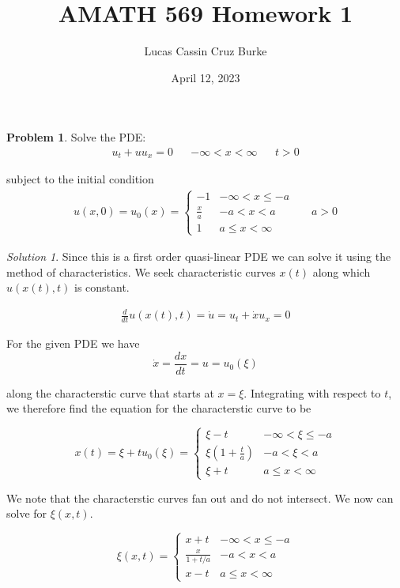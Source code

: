 \documentclass[12pt,a4paper]{article}
\title{AMATH 569 Homework 1}
\author{Lucas Cassin Cruz Burke}
\date{April 12, 2023}
\theoremstyle{definition}
\newtheorem{problem}{Problem}
\theoremstyle{remark}
\newtheorem*{solution}{Solution}
\begin{document}
\maketitle

\begin{problem}
  Solve the PDE: 
  \begin{align*}
    u_t + uu_x = 0 && -\infty < x < \infty && t >0
  \end{align*}

  subject to the initial condition \begin{align*}
    u(x,0) = u_0(x) = \begin{cases}
        -1 & -\infty < x \le -a \\
        \frac{x}{a} & -a < x < a \\
        1 & a \le x < \infty 
    \end{cases} && a>0
  \end{align*}
\end{problem}
\begin{solution}
  Since this is a first order quasi-linear PDE we can solve it using the method of characteristics. We seek characteristic curves $x(t)$ along which $u(x(t),t)$ is constant. 

  \begin{align*}
    \frac{d}{dt} u(x(t), t) = \dot u = u_t + \dot x u_x = 0 
  \end{align*}
\end{solution}

For the given PDE we have $$\dot x = \frac{dx}{dt} = u = u_0(\xi)$$

along the characterstic curve that starts at $x=\xi$. Integrating with respect to $t$, we therefore find the equation for the characterstic curve to be 

$$x(t) = \xi + t u_0(\xi) = \begin{cases}
  \xi -t & -\infty < \xi \le -a \\
  \xi\left( 1 + \frac{t}{a}\right) & -a < \xi < a \\
  \xi +t & a \le x < \infty
\end{cases}$$

We note that the characterstic curves fan out and do not intersect. We now can solve for $\xi(x,t)$.

$$\xi(x,t) = \begin{cases}
  x + t & -\infty < x \le -a \\
  \frac{x}{1 + t/a} & -a < x < a \\
  x-t & a \le x < \infty
\end{cases}$$
\end{document}
